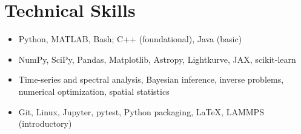 \section{Technical Skills}

\begin{itemize}[
  leftmargin=0.15in,
  label={},
  itemsep=2pt,
  topsep=3pt
]
  \small

  \item {}
    {Python, MATLAB, Bash; C++ (foundational), Java (basic)}

  \item {}
    {NumPy, SciPy, Pandas, Matplotlib, Astropy, Lightkurve, JAX, scikit-learn}

  \item {}
    {Time-series and spectral analysis, Bayesian inference, inverse problems,
    numerical optimization, spatial statistics}

  \item {}
    {Git, Linux, Jupyter, pytest, Python packaging, \LaTeX, LAMMPS (introductory)}

\end{itemize}
